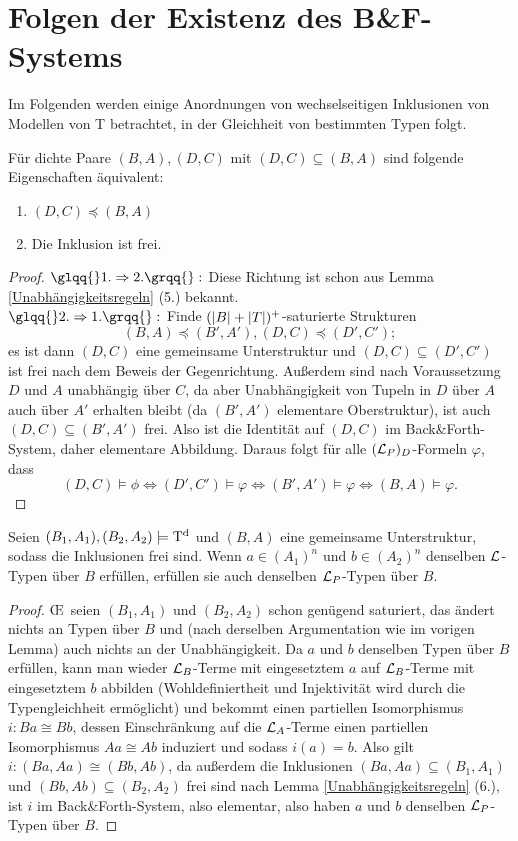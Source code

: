 \section{Folgen der Existenz des B\&F-Systems}
Im Folgenden werden einige Anordnungen von wechselseitigen Inklusionen von Modellen von T betrachtet, in der Gleichheit von bestimmten Typen folgt.

\begin{lemma}\label{freie Inklusionen}
	Für dichte Paare $(B,A),(D,C)$ mit $(D,C)\subseteq(B,A)$ sind folgende Eigenschaften äquivalent:
	\begin{enumerate}
		\item $(D,C)\preceq(B,A)$
		\item Die Inklusion ist frei.
	\end{enumerate}
\end{lemma}
\begin{proof}
	$\glqq{}1.\Rightarrow2.\grqq{}:$ Diese Richtung ist schon aus Lemma \ref{Unabhängigkeitsregeln} (5.) bekannt.\\
	$\glqq{}2.\Rightarrow1.\grqq{}:$ Finde $({\left| B \right|}+{\left| T \right|})^+$-saturierte Strukturen $$(B,A)\preceq(B',A'),(D,C)\preceq(D',C');$$ es ist dann $(D,C)$ eine gemeinsame Unterstruktur und $(D,C)\subseteq(D',C')$ ist frei nach dem Beweis der Gegenrichtung. Außerdem sind nach Voraussetzung $D$ und $A$ unabhängig über $C$, da aber Unabhängigkeit von Tupeln in $D$ über $A$ auch über $A'$ erhalten bleibt (da $(B',A')$ elementare Oberstruktur), ist auch $(D,C)\subseteq(B',A')$ frei. Also ist die Identität auf $(D,C)$ im Back\&Forth-System, daher elementare Abbildung. Daraus folgt für alle $(\mathcal{L}_P)_D$-Formeln $\varphi$, dass $$(D,C)\models\phi\Leftrightarrow(D',C')\models\varphi\Leftrightarrow(B',A')\models\varphi\Leftrightarrow(B,A)\models\varphi.$$
\end{proof}

\begin{lemma}\label{Gemeinsame Unterstruktur}
	Seien $(B_1,A_1),(B_2,A_2)\models\operatorname{T^d}$ und $(B,A)$ eine gemeinsame Unterstruktur, sodass die Inklusionen frei sind. Wenn $a\in (A_1)^n$ und $b\in (A_2)^n$ denselben $\mathcal{L}$-Typen über $B$ erfüllen, erfüllen sie auch denselben $\mathcal{L}_P$-Typen über $B$.
\end{lemma}
\begin{proof}
	\OE\ seien $(B_1,A_1)$ und $(B_2,A_2)$ schon genügend saturiert, das ändert nichts an Typen über $B$ und (nach derselben Argumentation wie im vorigen Lemma) auch nichts an der Unabhängigkeit. Da $a$ und $b$ denselben Typen über $B$ erfüllen, kann man wieder $\mathcal{L}_B$-Terme mit eingesetztem $a$ auf $\mathcal{L}_B$-Terme mit eingesetztem $b$ abbilden (Wohldefiniertheit und Injektivität wird durch die Typengleichheit ermöglicht) und bekommt einen partiellen Isomorphismus $i:Ba\cong Bb$, dessen Einschränkung auf die $\mathcal{L}_A$-Terme einen partiellen Isomorphismus $Aa\cong Ab$ induziert und sodass $i(a)=b$. Also gilt $i:(Ba,Aa)\cong(Bb,Ab)$, da außerdem die Inklusionen $(Ba,Aa)\subseteq(B_1,A_1)$ und $(Bb,Ab)\subseteq(B_2,A_2)$ frei sind nach Lemma \ref{Unabhängigkeitsregeln} (6.), ist $i$ im Back\&Forth-System, also elementar, also haben $a$ und $b$ denselben $\mathcal{L}_P$-Typen über $B$.
\end{proof}

